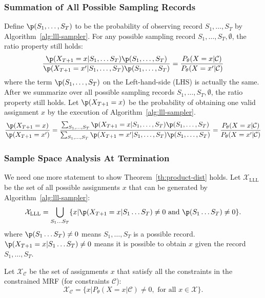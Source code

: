 \subsubsection{Summation of All Possible Sampling Records} Define $\p(S_1,\ldots,S_T)$ to be the probability of observing record $S_1,\ldots,S_T$ by Algorithm~\ref{alg:lll-sampler}.
For any possible sampling record $S_1,\ldots,S_{T}, \emptyset$, the ratio property still holds:
\begin{equation*}
\frac{\p(X_{T+1}=x|S_1,\ldots S_T)\p(S_1,\ldots,S_T)}{\p(X_{T+1}=x'|S_1,\ldots,S_T)\p(S_1,\ldots,S_T)}=\frac{P_{\theta}(X=x|\mathcal{C})}{P_{\theta}(X=x'|\mathcal{C})}
\end{equation*}
where the term $\p(S_1,\ldots,S_T)$ on the Left-hand-side (LHS) is actually the same.
After we summarize over all possible sampling records $S_1,\ldots,S_{T},\emptyset$, the ratio property still holds. Let $\p(X_{T+1}=x)$ be the probability of obtaining one valid assignment $x$ by the execution of Algorithm~\ref{alg:lll-sampler}.
\begin{equation} \label{eq:ratio-final}
\frac{\p(X_{T+1}=x)}{\p(X_{T+1}=x')}=\frac{\sum_{S_1,\ldots,S_T}\p(X_{T+1}=x|S_1,\ldots,S_T)\p(S_1,\ldots,S_T)}{\sum_{S_1,\ldots,S_T}\p(X_{T+1}=x'|S_1,\ldots,S_T)\p(S_1,\ldots,S_T)}=\frac{P_{\theta}(X=x|\mathcal{C})}{P_{\theta}(X=x'|\mathcal{C})}
\end{equation}

\subsubsection{Sample Space Analysis At Termination}
We need one more statement to show Theorem~\ref{th:product-dist} holds. Let $\mathcal{X}_{\text{LLL}}$ be the set of all possible  assignments $x$ that can be generated by Algorithm~\ref{alg:lll-sampler}:
\begin{equation*}
\mathcal{X}_{\text{LLL}}=\bigcup_{S_1\ldots S_T}\{x|\p(X_{T+1}=x|S_1\ldots S_T) \neq 0 \text{ and } \p(S_1\ldots S_T)\neq 0\}.
\end{equation*}
{where $ \p(S_1\ldots S_T)\neq 0$ means $S_1,\ldots,S_T$ is a possible record. $\p(X_{T+1}=x|S_1\ldots S_T) \neq 0$ means it is possible to obtain $x$ given the record $S_1,\ldots,S_T$.}

Let $\mathcal{X}_{\mathcal{C}}$ be the set of assignments $x$ that satisfy all the constraints in the constrained MRF (for constraints $\mathcal{C}$):
\begin{equation*}
\mathcal{X}_{\mathcal{C}}=\{x|P_{\theta}(X=x|\mathcal{C}) \neq 0, \text{ for all }x\in\mathcal{X}\}.
\end{equation*}


